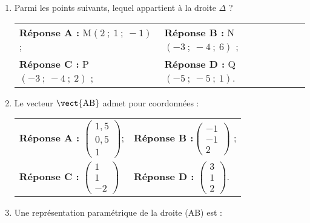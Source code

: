 \begin{enumerate}
\item Parmi les points suivants, lequel appartient à la droite $\Delta$ ?
\begin{center}
\begin{tabularx}{\linewidth}{X X}
\textbf{Réponse A :} M$(2~;~1~;~-1)$; & \textbf{Réponse B :} N$(-3~;~-4~;~6)$ ;\\
\textbf{Réponse C :} P$(-3~;~-4~;~2)$ ; & \textbf{Réponse D :} Q$(-5~;~-5~;~1)$.
\end{tabularx}
\end{center}

\item Le vecteur $\vect{\text{AB}}$ admet pour coordonnées : 

\begin{center}
\begin{tabularx}{\linewidth}{X X}
\textbf{Réponse A :} $\begin{pmatrix}1,5\\0,5\\1\end{pmatrix}$;& \textbf{Réponse B :}$\begin{pmatrix}-1\\-1\\2\end{pmatrix}$ ;\\
\textbf{Réponse C :} $\begin{pmatrix}1\\1\\-2\end{pmatrix}$& \textbf{Réponse D :} $\begin{pmatrix}3\\1\\2\end{pmatrix}$.
\end{tabularx}
\end{center}

\item Une représentation paramétrique de la droite (AB) est :


\end{enumerate}
